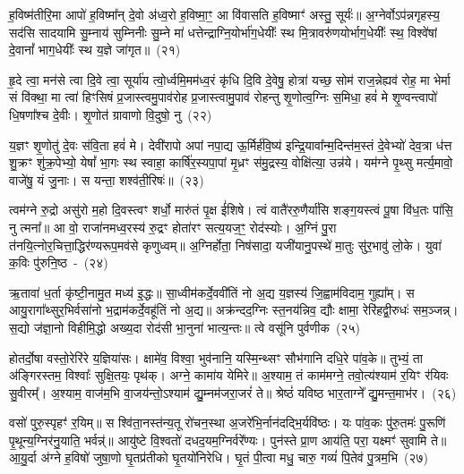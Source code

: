 {\anuvakamend[{अ॒सि॒ षड्विꣳ॑शतिश्च}]}%

ह॒विष्म॑तीरि॒मा आपो॑ ह॒विष्मा᳚न् दे॒वो अ॑ध्व॒रो ह॒विष्मा॒ꣳ॒ आ वि॑वासति ह॒विष्माꣳ॑ अस्तु॒ सूर्यः॑॥ अ॒ग्नेर्वो\-ऽप॑न्नगृहस्य॒ सद॑सि सादयामि सु॒म्नाय॑ सुम्निनीः सु॒म्ने मा॑ धत्तेन्द्राग्नि॒योर्भा॑ग॒धेयीः᳚ स्थ मि॒त्रावरु॑णयोर्भाग॒\-धेयीः᳚ स्थ॒ विश्वे॑षां दे॒वानां᳚ भाग॒\-धेयीः᳚ स्थ य॒ज्ञे जा॑गृत॥~(२१)\ip

{\anuvakamend[{ह॒विष्म॑ती॒श्चतु॑स्रिꣳशत्}]}%

हृ॒दे त्वा॒ मन॑से त्वा दि॒वे त्वा॒ सूर्या॑य त्वो॒र्ध्वमि॒मम॑ध्व॒रं कृ॑धि दि॒वि दे॒वेषु॒ होत्रा॑ यच्छ॒ सोम॑ राज॒न्नेह्यव॑ रोह॒ मा भेर्मा सं वि॑क्था॒ मा त्वा॑ हिꣳसिषं प्र॒जास्त्वमु॒पाव॑रोह प्र॒जास्त्वामु॒पाव॑ रोहन्तु शृ॒णोत्व॒ग्निः स॒मिधा॒ हवं॑ मे शृ॒ण्वन्त्वापो॑ धि॒षणा᳚श्च दे॒वीः। शृ॒णोत॑ ग्रावाणो वि॒दुषो॒ नु~(२२)\ip

य॒ज्ञꣳ शृ॒णोतु॑ दे॒वः स॑वि॒ता हवं॑ मे। देवी॑रापो अपां नपा॒द्य ऊ॒र्मिर्\mbox{}ह॑वि॒ष्य॑ इन्द्रि॒यावा᳚न्म॒दिन्त॑म॒स्तं दे॒वेभ्यो॑ देव॒त्रा ध॑त्त शु॒क्रꣳ शु॑क्र॒पेभ्यो॒ येषां᳚ भा॒गः स्थ स्वाहा॒ कार्\mbox{}षि॑र॒स्यपा॒पां मृ॒ध्रꣳ स॑मु॒द्रस्य॒ वोक्षि॑त्या॒ उन्न॑ये। यम॑ग्ने पृ॒थ्सु मर्त्य॒मावो॒ वाजे॑षु॒ यं जु॒नाः। स यन्ता॒ शश्व॑ती॒रिषः॑॥~(२३)\ip

{\anuvakamend[{नु स॒प्तच॑त्वारिꣳशच्च}]}%

त्वम॑ग्ने रु॒द्रो असु॑रो म॒हो दि॒वस्त्वꣳ शर्धो॒ मारु॑तं पृ॒क्ष ई॑शिषे। त्वं वातै॑ररु॒णैर्या॑सि शङ्ग॒यस्त्वं पू॒षा वि॑ध॒तः पा॑सि॒ नु त्मना᳚॥ आ वो॒ राजा॑नमध्व॒रस्य॑ रु॒द्रꣳ होता॑रꣳ सत्य॒यज॒ꣳ॒ रोद॑स्योः। अ॒ग्निं पु॒रा त॑नयि॒त्नोर॒चित्ता॒द्धिर॑ण्यरूप॒मव॑से कृणुध्वम्॥ अ॒ग्निर्\mbox{}होता॒ निष॑सादा॒ यजी॑यानु॒पस्थे॑ मा॒तुः सु॑र॒भावु॑ लो॒के। युवा॑ क॒विः पु॑रुनि॒ष्ठ~-~(२४)\ip

ऋ॒तावा॑ ध॒र्ता कृ॑ष्टी॒नामु॒त मध्य॑ इ॒द्धः॥ सा॒ध्वीम॑कर्दे॒ववी॑तिं नो अ॒द्य य॒ज्ञस्य॑ जि॒ह्वाम॑विदाम॒ गुह्या᳚म्। स आयु॒रागा᳚थ्सुर॒\-भिर्वसा॑नो भ॒द्राम॑कर्दे॒वहू॑तिं नो अ॒द्य॥ अक्र॑न्दद॒ग्निः स्त॒नय॑न्निव॒ द्यौः क्षामा॒ रेरि॑हद्वी॒रुधः॑ सम॒ञ्जन्न्। स॒द्यो ज॑ज्ञा॒नो विहीमि॒द्धो अख्य॒दा रोद॑सी भा॒नुना॑ भात्य॒न्तः॥ त्वे वसू॑नि पुर्वणीक~(२५)\ip

होतर्दो॒षा वस्तो॒रेरि॑रे य॒ज्ञिया॑सः। क्षामे॑व॒ विश्वा॒ भुव॑नानि॒ यस्मि॒न्थ्सꣳ सौभ॑गानि दधि॒रे पा॑व॒के॥ तुभ्यं॒ ता अ॑ङ्गिरस्तम॒ विश्वाः᳚ सुक्षि॒तयः॒ पृथ॑क्। अग्ने॒ कामा॑य येमिरे॥ अ॒श्याम॒ तं काम॑मग्ने॒ तवो॒त्य॑श्याम॑ र॒यिꣳ र॑यिवः सु॒वीरम्᳚। अ॒श्याम॒ वाज॑म॒भि वा॒जय॑न्तो॒\-ऽश्याम॑ द्यु॒म्नम॑जरा॒जरं॑ ते॥ श्रेष्ठं॑ यविष्ठ भार॒ताग्ने᳚ द्यु॒मन्त॒माभ॑र।~(२६)\ip

वसो॑ पुरु॒स्पृहꣳ॑ र॒यिम्॥ स श्वि॑ता॒नस्त॑न्य॒तू रो॑चन॒स्था अ॒जरे॑भि॒र्नान॑दद्भि॒र्यवि॑ष्ठः। यः पा॑व॒कः पु॑रु॒तमः॑ पु॒रूणि॑ पृ॒थून्य॒ग्निर॑नु॒याति॒ भर्वन्न्॑॥ आयु॑ष्टे वि॒श्वतो॑ दधद॒यम॒ग्निर्वरे᳚ण्यः। पुन॑स्ते प्रा॒ण आय॑ति॒ परा॒ यक्ष्मꣳ॑ सुवामि ते॥ आ॒यु॒र्दा अ॑ग्ने ह॒विषो॑ जुषा॒णो घृ॒तप्र॑तीको घृ॒तयो॑निरेधि। घृ॒तं पी॒त्वा मधु॒ चारु॒ गव्यं॑ पि॒तेव॑ पु॒त्रम॒भि~(२७)\ip


